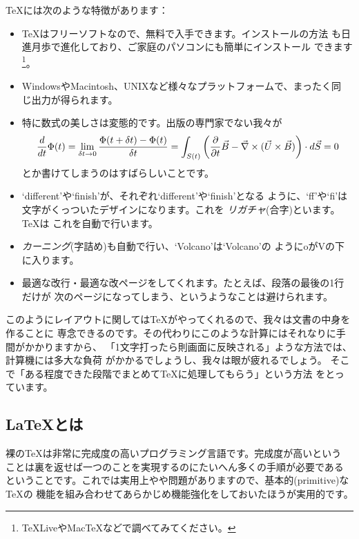 {\TeX}には次のような特徴があります：
\begin{itemize}
 \item {\TeX}はフリーソフトなので、無料で入手できます。インストールの方法
       も日進月歩で進化しており、ご家庭のパソコンにも簡単にインストール
       できます\footnote{TeXLiveやMacTeXなどで調べてみてください。}。
 \item WindowsやMacintosh、UNIXなど様々なプラットフォームで、まったく同
       じ出力が得られます。
 \item 特に数式の美しさは変態的です。出版の専門家でない我々が
\begin{equation}
 \frac{d}{dt} \Phi (t) = \lim_{\delta t \rightarrow 0} \frac{\Phi(t +
  \delta t) - \Phi(t)}{\delta t} \\
    =  \int_{S(t)} \left( \frac{\partial}{\partial t} \vec{B} -
		      \vec{\nabla} \times (\vec{U} \times
		      \vec{B})  \right) \cdot
    d \vec{S} = 0 \nonumber
\end{equation}
       とか書けてしまうのはすばらしいことです。
 \item `dif{}ferent'や`f{}inish'が、それぞれ`different'や`finish'となる
       ように、`ff'や`fi'は文字がくっついたデザインになります。これを
       \emph{リガチャ}(合字)といます。{\TeX}は
       これを自動で行います。
 \item \emph{カーニング}(字詰め)も自動で行い、`V{}olcano'は`Volcano'の
       ようにoがVの下に入ります。
 \item 最適な改行・最適な改ページをしてくれます。たとえば、段落の最後の1行だけが
       次のページになってしまう、というようなことは避けられます。
\end{itemize}
このようにレイアウトに関しては{\TeX}がやってくれるので、我々は文書の中身を作ることに
専念できるのです。その代わりにこのような計算にはそれなりに手間がかかりますから、
「1文字打ったら則画面に反映される」ような方法では、計算機には多大な負荷
がかかるでしょうし、我々は眼が疲れるでしょう。
そこで「ある程度できた段階でまとめて{\TeX}に処理してもらう」という方法
をとっています。

\subsection{\LaTeX とは}

裸の{\TeX}は非常に完成度の高いプログラミング言語です。完成度が高いという
ことは裏を返せば一つのことを実現するのにたいへん多くの手順が必要である
ということです。これでは実用上やや問題がありますので、基本的(primitive)な{\TeX}の
機能を組み合わせてあらかじめ機能強化をしておいたほうが実用的です。


